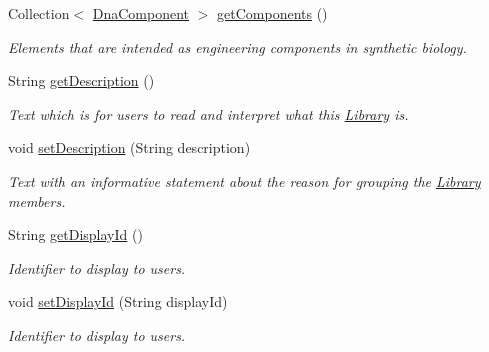 \begin{DoxyCompactItemize}
\item 
Collection$<$ \hyperlink{classorg_1_1sbolstandard_1_1lib_s_b_o_lj_1_1_dna_component}{DnaComponent} $>$ \hyperlink{classorg_1_1sbolstandard_1_1lib_s_b_o_lj_1_1_library_a8738a163d2c83255f906dad48a44e260}{getComponents} ()
\begin{DoxyCompactList}\small\item\em Elements that are intended as engineering components in synthetic biology. \item\end{DoxyCompactList}\item 
String \hyperlink{classorg_1_1sbolstandard_1_1lib_s_b_o_lj_1_1_library_ad4935054c95da4f9939ed824567ec984}{getDescription} ()
\begin{DoxyCompactList}\small\item\em Text which is for users to read and interpret what this \hyperlink{classorg_1_1sbolstandard_1_1lib_s_b_o_lj_1_1_library}{Library} is. \item\end{DoxyCompactList}\item 
void \hyperlink{classorg_1_1sbolstandard_1_1lib_s_b_o_lj_1_1_library_a6f0d4c5fed91ca4e08896e07e46ae80d}{setDescription} (String description)
\begin{DoxyCompactList}\small\item\em Text with an informative statement about the reason for grouping the \hyperlink{classorg_1_1sbolstandard_1_1lib_s_b_o_lj_1_1_library}{Library} members. \item\end{DoxyCompactList}\item 
String \hyperlink{classorg_1_1sbolstandard_1_1lib_s_b_o_lj_1_1_library_a47510ab239dfd2f5cde80db8761bc8ea}{getDisplayId} ()
\begin{DoxyCompactList}\small\item\em Identifier to display to users. \item\end{DoxyCompactList}\item 
void \hyperlink{classorg_1_1sbolstandard_1_1lib_s_b_o_lj_1_1_library_a2c4a35fe2570648b10dcaaf10446a577}{setDisplayId} (String displayId)
\begin{DoxyCompactList}\small\item\em Identifier to display to users. \item\end{DoxyCompactList}\item 

\end{DoxyCompactItemize}
